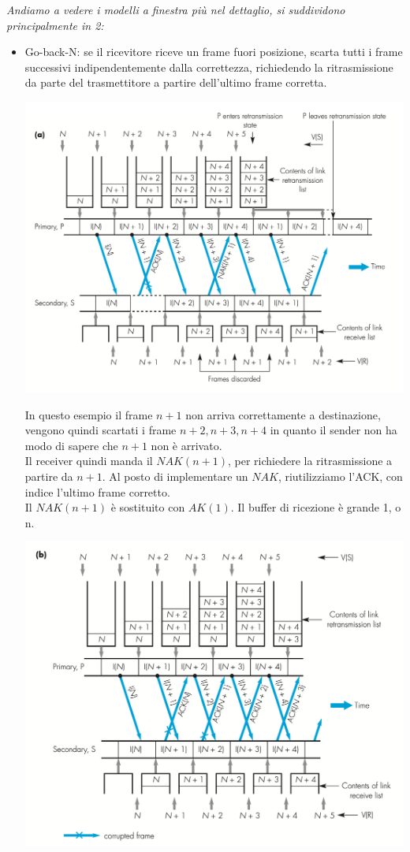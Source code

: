 \documentclass[11pt, oneside]{article}   	%
\begin{document}
\emph{Andiamo a vedere i modelli a finestra più nel dettaglio, si suddividono principalmente in 2:}
\begin{itemize}\item Go-back-N: se il ricevitore riceve un frame fuori posizione, scarta tutti i frame successivi indipendentemente dalla correttezza, richiedendo la ritrasmissione da parte del trasmettitore a partire dell'ultimo frame corretta.
\begin{center}
\includegraphics[scale=0.5]{nak}
\end{center}
In questo esempio il frame $n + 1$ non arriva correttamente a destinazione, vengono quindi scartati i frame $n +2, n + 3, n + 4$ in quanto il sender non ha modo di sapere che $n + 1$ non è arrivato.\\
Il receiver quindi manda il $NAK(n + 1)$, per richiedere la ritrasmissione a partire da $n+1$.
Al posto di implementare un $NAK$, riutilizziamo l'ACK, con indice l'ultimo frame corretto.\\
Il $NAK(n+1)$ è sostituito con $AK(1)$. Il buffer di ricezione è grande 1, o n.
\begin{center}
\includegraphics[scale=0.5]{nak2}

\end{center}
\end{itemize}
\end{document}
